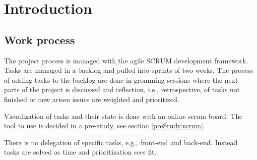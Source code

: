 \chapter{Introduction}

\section*{Work process}
The project process is managed with the agile SCRUM development framework. 
Tasks are managed in a backlog and pulled into sprints of two weeks. 
The process of adding tasks to the backlog are done in gromming sessions where the next parts of the project is discussed and reflection, i.e., retrospective, of tasks not finished or new arisen issues are weighted and prioritized.

Visualization of tasks and their state is done with an online scrum board. 
The tool to use is decided in a pre-study, see section \ref{preStudy:scrum}.

There is no delegation of specific tasks, e.g., front-end and back-end. 
Instead tasks are solved as time and prioritization sees fit.
